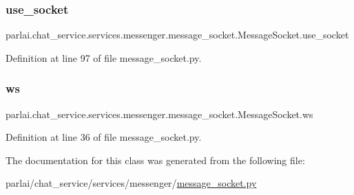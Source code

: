 \subsubsection{\texorpdfstring{use\+\_\+socket}{use\_socket}}
{\footnotesize\ttfamily parlai.\+chat\+\_\+service.\+services.\+messenger.\+message\+\_\+socket.\+Message\+Socket.\+use\+\_\+socket}



Definition at line 97 of file message\+\_\+socket.\+py.

\mbox{\label{classparlai_1_1chat__service_1_1services_1_1messenger_1_1message__socket_1_1MessageSocket_abc5470121d0bc666fd184f9278adb409}} 
\subsubsection{\texorpdfstring{ws}{ws}}
{\footnotesize\ttfamily parlai.\+chat\+\_\+service.\+services.\+messenger.\+message\+\_\+socket.\+Message\+Socket.\+ws}



Definition at line 36 of file message\+\_\+socket.\+py.



The documentation for this class was generated from the following file\+:\begin{DoxyCompactItemize}
\item 
parlai/chat\+\_\+service/services/messenger/\hyperlink{message__socket_8py}{message\+\_\+socket.\+py}\end{DoxyCompactItemize}
